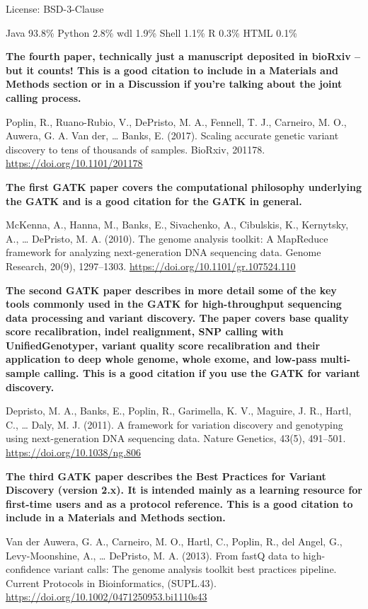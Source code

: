 \documentclass[]{article}
\begin{document}
License: BSD-3-Clause

Java 93.8\% Python 2.8\% wdl 1.9\% Shell 1.1\% R 0.3\% HTML 0.1\%

\textbf{The fourth paper, technically just a manuscript deposited in bioRxiv -- but it counts! This is a good citation to include in a Materials and Methods section or in a Discussion if you're talking about the joint calling process.}

Poplin, R., Ruano-Rubio, V., DePristo, M. A., Fennell, T. J., Carneiro, M. O., Auwera, G. A. Van der, … Banks, E. (2017). Scaling accurate genetic variant discovery to tens of thousands of samples. BioRxiv, 201178. \url{https://doi.org/10.1101/201178}

\textbf{The first GATK paper covers the computational philosophy underlying the GATK and is a good citation for the GATK in general.}

McKenna, A., Hanna, M., Banks, E., Sivachenko, A., Cibulskis, K., Kernytsky, A., … DePristo, M. A. (2010). The genome analysis toolkit: A MapReduce framework for analyzing next-generation DNA sequencing data. Genome Research, 20(9), 1297–1303. \url{https://doi.org/10.1101/gr.107524.110}

\textbf{The second GATK paper describes in more detail some of the key tools commonly used in the GATK for high-throughput sequencing data processing and variant discovery. The paper covers base quality score recalibration, indel realignment, SNP calling with UnifiedGenotyper, variant quality score recalibration and their application to deep whole genome, whole exome, and low-pass multi-sample calling. This is a good citation if you use the GATK for variant discovery.}

Depristo, M. A., Banks, E., Poplin, R., Garimella, K. V., Maguire, J. R., Hartl, C., … Daly, M. J. (2011). A framework for variation discovery and genotyping using next-generation DNA sequencing data. Nature Genetics, 43(5), 491–501. \url{https://doi.org/10.1038/ng.806}

\textbf{The third GATK paper describes the Best Practices for Variant Discovery (version 2.x). It is intended mainly as a learning resource for first-time users and as a protocol reference. This is a good citation to include in a Materials and Methods section.}

Van der Auwera, G. A., Carneiro, M. O., Hartl, C., Poplin, R., del Angel, G., Levy-Moonshine, A., … DePristo, M. A. (2013). From fastQ data to high-confidence variant calls: The genome analysis toolkit best practices pipeline. Current Protocols in Bioinformatics, (SUPL.43). \url{https://doi.org/10.1002/0471250953.bi1110s43}
\end{document}
